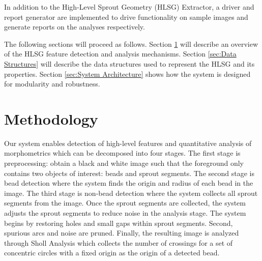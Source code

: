\documentclass{sig-alternate}
\begin{document}
	In addition to the High-Level Sprout Geometry (HLSG) Extractor, a driver
	and report generator are implemented to drive functionality on sample
	images and generate reports on the analyses respectively.

	The following sections will proceed as follows. Section
	\ref{sec:Methodology} will describe an overview of the HLSG feature
	detection and analysis mechanisms. Section \ref{sec:Data Structures}
	will describe the data structures used to represent the HLSG and its
	properties. Section \ref{sec:System Architecture} shows how the system
	is designed for modularity and robustness.

\section{Methodology} %
\label{sec:Methodology}




	Our system enables detection of high-level features and quantitative
	analysis of morphometrics which can be decomposed into four stages.
	The first stage is preprocessing: obtain a black and white image such
	that the foreground only contains two objects of interest: beads and
	sprout segments. The second stage is bead detection where the system
	finds the origin and radius of each bead in the image.  The third
	stage is non-bead detection where the system collects all sprout
	segments from the image. Once the sprout segments are collected, the
	system adjusts the sprout segments to reduce noise in the analysis
	stage. The system begins by restoring holes and small gaps within
	sprout segments. Second, spurious arcs and noise are pruned. Finally,
	the resulting image is analyzed through Sholl Analysis which collects
	the number of crossings for a set of concentric circles with a fixed
	origin as the origin of a detected bead.

\end{document}
